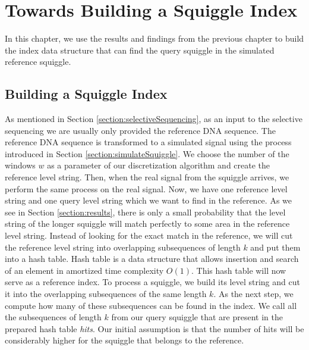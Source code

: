 \chapter{Towards Building a Squiggle Index}

\label{kap:methAdjust}

In this chapter, we use the results and findings from the previous chapter to
build the index data structure that can find the query squiggle in the simulated
reference squiggle.

\section{Building a Squiggle Index}
\label{section:indexIdea}

As mentioned in Section \ref{section:selectiveSequencing}, as an input to the selective
sequencing we are usually only provided the reference DNA sequence.
The reference DNA sequence is transformed to a simulated signal using the
process introduced in Section \ref{section:simulateSquiggle}. We choose the number of the windows $w$
as a parameter of our discretization algorithm and create the reference level string.
Then, when the real signal from the squiggle arrives, we perform the same process
on the real signal. Now, we have one reference level string and
one query level string which we want to find in the reference.
As we see in Section \ref{section:results}, there is only a small probability that the level string
of the longer squiggle will match perfectly to some area in the reference level string.
Instead of looking for the exact match in the reference, we will cut the reference
level string into overlapping subsequences of length $k$ and put them into a hash table.
Hash table is a data structure that allows insertion and search of an element in
amortized time complexity $O(1)$. This hash table will now serve as a reference index.
To process a squiggle, we build its level string and cut it into the overlapping
subsequences of the same length $k$. As the next step, we compute how many of these subsequences can be found in the index.
We call all the subsequences of length $k$ from our query squiggle that are
present in the prepared hash table \textit{hits}. Our initial assumption is that the number
of hits will be considerably higher for the squiggle that belongs to the reference.

